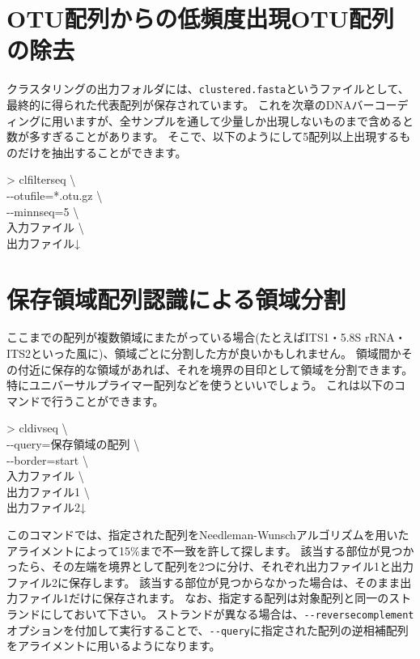 \documentclass[titlepage,10pt,a4paper]{jsbook}
\newenvironment{cmd}{\begin{oframed}\raggedright\ttfamily\footnotesize\setlength{\baselineskip}{1.4em}}{\end{oframed}\vspace{-1em}}
\begin{document}
\section{OTU配列からの低頻度出現OTU配列の除去}

クラスタリングの出力フォルダには、\texttt{clustered.fasta}というファイルとして、最終的に得られた代表配列が保存されています。
これを次章のDNAバーコーディングに用いますが、全サンプルを通して少量しか出現しないものまで含めると数が多すぎることがあります。
そこで、以下のようにして5配列以上出現するものだけを抽出することができます。

\begin{cmd}
{\textgreater} clfilterseq {\textbackslash}\\
{-}{-}otufile=*.otu.gz {\textbackslash}\\
{-}{-}minnseq=5 {\textbackslash}\\
入力ファイル {\textbackslash}\\
出力ファイル↓
\end{cmd}

\section{保存領域配列認識による領域分割}

ここまでの配列が複数領域にまたがっている場合(たとえばITS1・5.8S rRNA・ITS2といった風に)、領域ごとに分割した方が良いかもしれません。
領域間かその付近に保存的な領域があれば、それを境界の目印として領域を分割できます。
特にユニバーサルプライマー配列などを使うといいでしょう。
これは以下のコマンドで行うことができます。

\begin{cmd}
{\textgreater} cldivseq {\textbackslash}\\
{-}{-}query=保存領域の配列 {\textbackslash}\\
{-}{-}border=start {\textbackslash}\\
入力ファイル {\textbackslash}\\
出力ファイル1 {\textbackslash}\\
出力ファイル2↓
\end{cmd}

このコマンドでは、指定された配列をNeedleman-Wunschアルゴリズムを用いたアライメントによって15\%まで不一致を許して探します。
該当する部位が見つかったら、その左端を境界として配列を2つに分け、それぞれ出力ファイル1と出力ファイル2に保存します。
該当する部位が見つからなかった場合は、そのまま出力ファイル1だけに保存されます。
なお、指定する配列は対象配列と同一のストランドにしておいて下さい。
ストランドが異なる場合は、\texttt{{-}{-}reversecomplement}オプションを付加して実行することで、\texttt{{-}{-}query}に指定された配列の逆相補配列をアライメントに用いるようになります。
\end{document}

